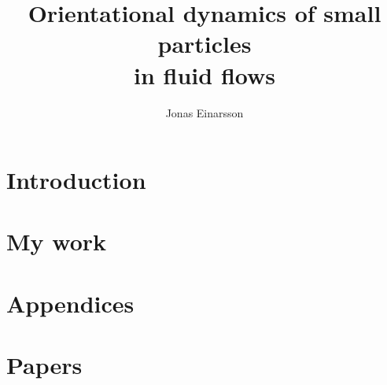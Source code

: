 \documentclass[licentiate,nocover,g5paper,11pt]{gu-thesis}
\title{Orientational dynamics of small particles \\ in fluid flows}
\author{Jonas Einarsson} %
\begin{document}
\setcounter{page}{-99} %

\pagestyle{empty}
{}
\maketitlepage
\newpage\makeprintinfopage
\newpage\makeabstractpage
\cleardoublepage\maketableofpaperspage
\newpage\makeacknowledgementspage
\cleardoublepage\tableofcontents
\cleardoublepage{}
\pagestyle{fancy}


\part{Introduction} %
\thispagestyle{empty}
 
\clearpage
\part{My work} %
\thispagestyle{fb}


\clearpage

\nobibliography*


\part{Appendices} %
\thispagestyle{fb}
\appendix
%
\clearpage

\label{endpage}\part{Papers}
\pagestyle{fb}


\pagestyle{fb}
\cleardoublepage
\end{document}
